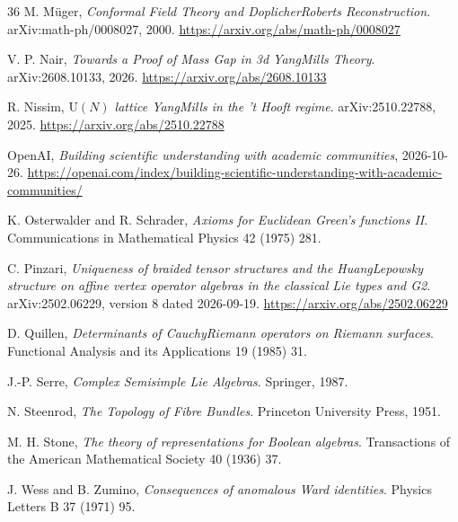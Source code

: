 \documentclass[11pt,letterpaper]{article}
\theoremstyle{definition}
\theoremstyle{remark}
\begin{document}
\begin{thebibliography}{36}
M. M\"uger, \emph{Conformal Field Theory and Doplicher\textendash{}Roberts Reconstruction}. arXiv:math-ph/0008027, 2000. \url{https://arxiv.org/abs/math-ph/0008027}

V. P. Nair, \emph{Towards a Proof of Mass Gap in 3d Yang\textendash{}Mills Theory}. arXiv:2608.10133, 2026. \url{https://arxiv.org/abs/2608.10133}

R. Nissim, \emph{$\mathrm{U}(N)$ lattice Yang\textendash{}Mills in the 't Hooft regime}. arXiv:2510.22788, 2025. \url{https://arxiv.org/abs/2510.22788}

OpenAI, \emph{Building scientific understanding with academic communities}, 2026-10-26. \url{https://openai.com/index/building-scientific-understanding-with-academic-communities/}

K. Osterwalder and R. Schrader, \emph{Axioms for Euclidean Green's functions II}. Communications in Mathematical Physics 42 (1975) 281.

C. Pinzari, \emph{Uniqueness of braided tensor structures and the Huang\textendash{}Lepowsky structure on affine vertex operator algebras in the classical Lie types and G2}. arXiv:2502.06229, version 8 dated 2026-09-19. \url{https://arxiv.org/abs/2502.06229}

D. Quillen, \emph{Determinants of Cauchy\textendash{}Riemann operators on Riemann surfaces}. Functional Analysis and its Applications 19 (1985) 31.

J.-P. Serre, \emph{Complex Semisimple Lie Algebras}. Springer, 1987.

N. Steenrod, \emph{The Topology of Fibre Bundles}. Princeton University Press, 1951.

M. H. Stone, \emph{The theory of representations for Boolean algebras}. Transactions of the American Mathematical Society 40 (1936) 37.

J. Wess and B. Zumino, \emph{Consequences of anomalous Ward identities}. Physics Letters B 37 (1971) 95.

\end{thebibliography}
\end{document}
